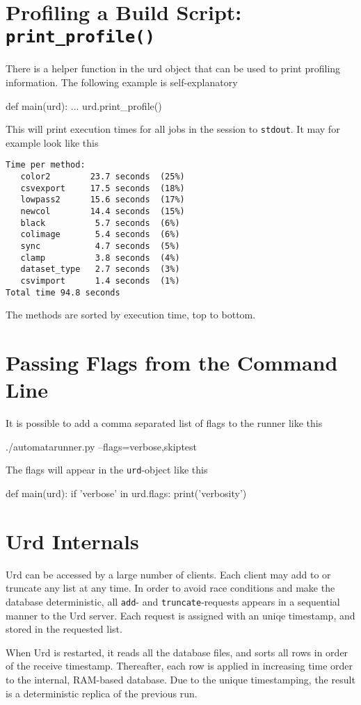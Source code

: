 \section{Profiling a Build Script:  \texttt{print\_profile()}}
There is a helper function in the urd object that can be used to print
profiling information.  The following example is self-explanatory
\begin{python}
def main(urd):
    ...
    urd.print_profile()
\end{python}
This will print execution times for all jobs in the session
to \texttt{stdout}.  It may for example look like this
\begin{verbatim}
Time per method:
   color2        23.7 seconds  (25%)
   csvexport     17.5 seconds  (18%)
   lowpass2      15.6 seconds  (17%)
   newcol        14.4 seconds  (15%)
   black          5.7 seconds  (6%)
   colimage       5.4 seconds  (6%)
   sync           4.7 seconds  (5%)
   clamp          3.8 seconds  (4%)
   dataset_type   2.7 seconds  (3%)
   csvimport      1.4 seconds  (1%)
Total time 94.8 seconds
\end{verbatim}
The methods are sorted by execution time, top to bottom.


\section{Passing Flags from the Command Line}
It is possible to add a comma separated list of flags to the runner
like this
\begin{python}
./automatarunner.py --flags=verbose,skiptest
\end{python}
The flags will appear in the \texttt{urd}-object like this
\begin{python}
def main(urd):
    if 'verbose' in urd.flags:
       print('verbosity')
\end{python}



\section{Urd Internals}
Urd can be accessed by a large number of clients.  Each client may add
to or truncate any list at any time.  In order to avoid race
conditions and make the database deterministic, all \texttt{add}-
and \texttt{truncate}-requests appears in a sequential manner to the
Urd server.  Each request is assigned with an uniqe timestamp, and
stored in the requested list.

When Urd is restarted, it reads all the database files, and sorts all
rows in order of the receive timestamp.  Thereafter, each row is
applied in increasing time order to the internal, RAM-based database.
Due to the unique timestamping, the result is a deterministic replica
of the previous run.
